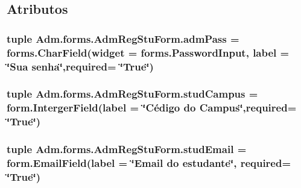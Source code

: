 \subsection{Atributos}
\hypertarget{classAdm_1_1forms_1_1AdmRegStuForm_aa2463e5a3bdc53561cf1a1212099b8ca}{
\subsubsection[{adm\-Pass}]{\setlength{\rightskip}{0pt plus 5cm}tuple Adm.\-forms.\-Adm\-Reg\-Stu\-Form.\-adm\-Pass = forms.\-Char\-Field(widget = forms.\-Password\-Input, label = \char`\"{}Sua senha\char`\"{},required= \char`\"{}True\char`\"{})\hspace{0.3cm}{\ttfamily [static]}}}\label{classAdm_1_1forms_1_1AdmRegStuForm_aa2463e5a3bdc53561cf1a1212099b8ca}
\hypertarget{classAdm_1_1forms_1_1AdmRegStuForm_ad626ad8ba2b3609252db029fba8112c1}{
\subsubsection[{stud\-Campus}]{\setlength{\rightskip}{0pt plus 5cm}tuple Adm.\-forms.\-Adm\-Reg\-Stu\-Form.\-stud\-Campus = form.\-Interger\-Field(label = \char`\"{}Cédigo do Campus\char`\"{},required= \char`\"{}True\char`\"{})\hspace{0.3cm}{\ttfamily [static]}}}\label{classAdm_1_1forms_1_1AdmRegStuForm_ad626ad8ba2b3609252db029fba8112c1}
\hypertarget{classAdm_1_1forms_1_1AdmRegStuForm_a7bb9d477582961bb017d459d7beb2a48}{
\subsubsection[{stud\-Email}]{\setlength{\rightskip}{0pt plus 5cm}tuple Adm.\-forms.\-Adm\-Reg\-Stu\-Form.\-stud\-Email = form.\-Email\-Field(label = \char`\"{}Email do estudante\char`\"{}, required= \char`\"{}True\char`\"{})\hspace{0.3cm}{\ttfamily [static]}}}\label{classAdm_1_1forms_1_1AdmRegStuForm_a7bb9d477582961bb017d459d7beb2a48}
